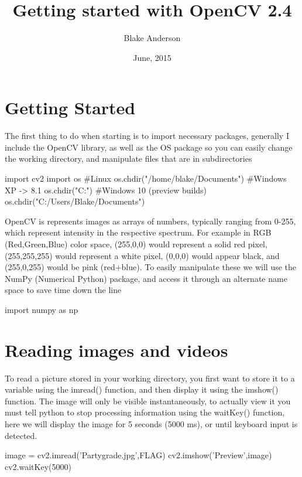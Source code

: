 \documentclass[a4paper,12pt]{article}
\begin{document}
\title{Getting started with OpenCV 2.4}
\author{Blake Anderson}
\date{June, 2015}
\maketitle

\section{Getting Started}

The first thing to do when starting is to import necessary packages, generally I include the OpenCV library, as well as the OS package so you can easily change the working directory, and manipulate files that are in subdirectories

\begin{python}
import cv2
import os
#Linux
os.chdir("/home/blake/Documents") 
#Windows XP -> 8.1
os.chdir("C:\Users\Blake\Documents")
#Windows 10 (preview builds)
os.chdir("C:/Users/Blake/Documents") 
\end{python}

OpenCV is represents images as arrays of numbers, typically ranging from 0-255, which represent intensity in the respective spectrum. For example in RGB (Red,Green,Blue) color space, (255,0,0) would represent a solid red pixel, (255,255,255) would represent a white pixel, (0,0,0) would appear black, and (255,0,255) would be pink (red+blue). To easily manipulate these we will use the NumPy (Numerical Python) package, and access it through an alternate name space to save time down the line

\begin{python}
import numpy as np
\end{python}
\newpage
\section{Reading images and videos}
To read a picture stored in your working directory, you first want to store it to a variable using the imread() function, and then display it using the imshow() function. The image will only be visible instantaneously, to actually view it you must tell python to stop processing information using the waitKey() function, here we will display the image for 5 seconds (5000 ms), or until keyboard input is detected.
\begin{python}
image = cv2.imread('Partygrade.jpg',FLAG)
cv2.imshow('Preview',image)
cv2.waitKey(5000)
\end{python}
\end{document}
